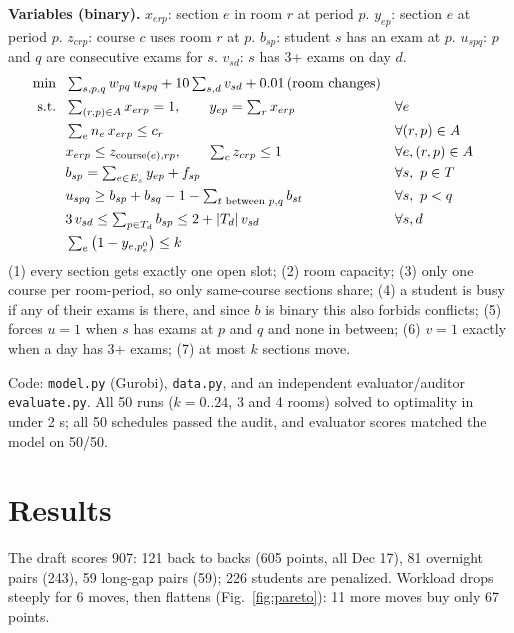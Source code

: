 \documentclass[11pt]{article}
\begin{document}
\textbf{Variables (binary).} $x_{erp}$: section $e$ in room $r$ at period $p$. $y_{ep}$: section $e$ at period $p$. $z_{crp}$: course $c$ uses room $r$ at $p$. $b_{sp}$: student $s$ has an exam at $p$. $u_{spq}$: $p$ and $q$ are consecutive exams for $s$. $v_{sd}$: $s$ has 3+ exams on day $d$.
\begin{align}
\min\ \ & \textstyle\sum_{s,p,q} w_{pq}\,u_{spq} + 10\sum_{s,d} v_{sd} + 0.01\,(\text{room changes}) \notag\\
\text{s.t.}\ \ & \textstyle\sum_{(r,p)\in A} x_{erp} = 1,\qquad y_{ep}=\sum_r x_{erp} && \forall e \\
& \textstyle\sum_e n_e\,x_{erp} \le c_r && \forall (r,p)\in A \\
& \textstyle x_{erp} \le z_{\text{course}(e),rp},\qquad \sum_c z_{crp} \le 1 && \forall e,(r,p)\in A \\
& \textstyle b_{sp} = \sum_{e\in E_s} y_{ep} + f_{sp} && \forall s,\ p\in T \\
& \textstyle u_{spq} \ge b_{sp} + b_{sq} - 1 - \sum_{t \text{ between } p,q} b_{st} && \forall s,\ p<q \\
& \textstyle 3\,v_{sd} \le \sum_{p\in T_d} b_{sp} \le 2 + |T_d|\,v_{sd} && \forall s,d \\
& \textstyle\sum_e \big(1 - y_{e,p^0_e}\big) \le k
\end{align}
(1) every section gets exactly one open slot; (2) room capacity; (3) only one course per room-period, so only same-course sections share; (4) a student is busy if any of their exams is there, and since $b$ is binary this also forbids conflicts; (5) forces $u=1$ when $s$ has exams at $p$ and $q$ and none in between; (6) $v=1$ exactly when a day has 3+ exams; (7) at most $k$ sections move.

Code: \texttt{model.py} (Gurobi), \texttt{data.py}, and an independent evaluator/auditor \texttt{evaluate.py}. All 50 runs ($k=0..24$, 3 and 4 rooms) solved to optimality in under 2 s; all 50 schedules passed the audit, and evaluator scores matched the model on 50/50.

\section{Results}
The draft scores 907: 121 back to backs (605 points, all Dec 17), 81 overnight pairs (243), 59 long-gap pairs (59); 226 students are penalized. Workload drops steeply for 6 moves, then flattens (Fig.~\ref{fig:pareto}): 11 more moves buy only 67 points.
\end{document}
